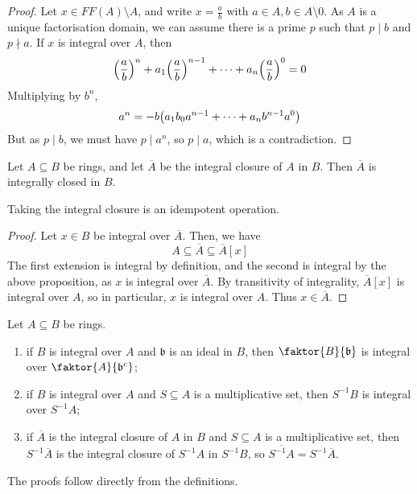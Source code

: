 \begin{proof}
    Let \( x \in FF(A) \setminus A \), and write \( x = \frac{a}{b} \) with \( a \in A, b \in A \setminus \qty{0} \).
    As \( A \) is a unique factorisation domain, we can assume there is a prime \( p \) such that \( p \mid b \) and \( p \nmid a \).
    If \( x \) is integral over \( A \), then
    \[ \qty(\frac{a}{b})^n + a_1 \qty(\frac{a}{b})^{n-1} + \dots + a_n \qty(\frac{a}{b})^0 = 0 \]
    Multiplying by \( b^n \),
    \[ a^n = - b \qty(a_1 b_0 a^{n-1} + \dots + a_n b^{n-1} a^0) \]
    But as \( p \mid b \), we must have \( p \mid a^n \), so \( p \mid a \), which is a contradiction.
\end{proof}
\begin{lemma}
    Let \( A \subseteq B \) be rings, and let \( \overline A \) be the integral closure of \( A \) in \( B \).
    Then \( \overline A \) is integrally closed in \( B \).
\end{lemma}
Taking the integral closure is an idempotent operation.
\begin{proof}
    Let \( x \in B \) be integral over \( \overline A \).
    Then, we have
    \[ A \subseteq \overline A \subseteq \overline A[x] \]
    The first extension is integral by definition, and the second is integral by the above proposition, as \( x \) is integral over \( \overline A \).
    By transitivity of integrality, \( \overline A[x] \) is integral over \( A \), so in particular, \( x \) is integral over \( A \).
    Thus \( x \in \overline A \).
\end{proof}
\begin{proposition}
    Let \( A \subseteq B \) be rings.
    \begin{enumerate}
        \item if \( B \) is integral over \( A \) and \( \mathfrak b \) is an ideal in \( B \), then \( \faktor{B}{\mathfrak b} \) is integral over \( \faktor{A}{\mathfrak b^c} \);
        \item if \( B \) is integral over \( A \) and \( S \subseteq A \) is a multiplicative set, then \( S^{-1}B \) is integral over \( S^{-1}A \);
        \item if \( \overline A \) is the integral closure of \( A \) in \( B \) and \( S \subseteq A \) is a multiplicative set, then \( S^{-1} \overline A \) is the integral closure of \( S^{-1} A \) in \( S^{-1} B \), so \( \overline{S^{-1}A} = S^{-1}\overline A \).
    \end{enumerate}
\end{proposition}
The proofs follow directly from the definitions.
